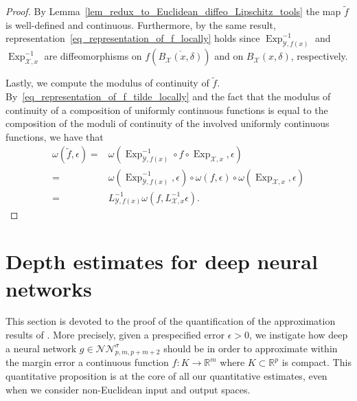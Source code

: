 \documentclass[anon,12pt]{colt2021} %
\newcommand{\xxx}{\mathcal{X}}
\newcommand{\yyy}{\mathcal{Y}}
\begin{document}
\begin{proof}
By Lemma~\ref{lem_redux_to_Euclidean_diffeo_Lipschitz_tools} the map $\tilde{f}$ is well-defined and continuous.  Furthermore, by the same result, representation~\eqref{eq_representation_of_f_locally} holds since $\operatorname{Exp}_{\yyy,f(x)}^{-1}$ and $\operatorname{Exp}_{\xxx,x}^{-1}$ are diffeomorphisms on $f\left(
\overline{B_{\xxx}(x,\delta)}
\right)$ and on $B_{\xxx}(x,\delta)$, respectively.  

Lastly, we compute the modulus of continuity of $\tilde{f}$.  By~\eqref{eq_representation_of_f_tilde_locally} and the fact that the modulus of continuity of a composition of uniformly continuous functions is equal to the composition of the moduli of continuity of the involved uniformly continuous functions, we have that
$$
\begin{aligned}
\omega(\tilde{f},\epsilon) =& \omega\left(
\operatorname{Exp}_{\yyy,f(x)}^{-1}
    \circ 
    f
    \circ 
    \operatorname{Exp}_{\xxx,x}
,\epsilon\right)\\
 = &\omega(
\operatorname{Exp}_{\yyy,f(x)}^{-1},\epsilon)\circ
    \omega(
    f,\epsilon)
    \circ 
    \omega(
    \operatorname{Exp}_{\xxx,x},\epsilon)
    \\
    = &
    L_{\yyy,f(x)}^{-1}\omega\left(
    f,L_{\xxx,x}^{-1}\epsilon
    \right).
\end{aligned}
$$
\end{proof}

\section{Depth estimates for deep neural networks}

This section is devoted to the proof of the quantification of the approximation results of \cite{kidger2019universal}.  More precisely, given a prespecified error $\epsilon > 0$, we instigate how deep a neural network $g \in \mathcal{NN}_{p,m,p+m+2}^{\sigma}$ should be in order to approximate within the margin error a continuous function $f: K \to \mathbb{R}^{m}$ where $K \subset \mathbb{R}^{p}$ is compact. This quantitative proposition is at the core of all our quantitative estimates, even when we consider non-Euclidean input and output spaces. 
\end{document}
